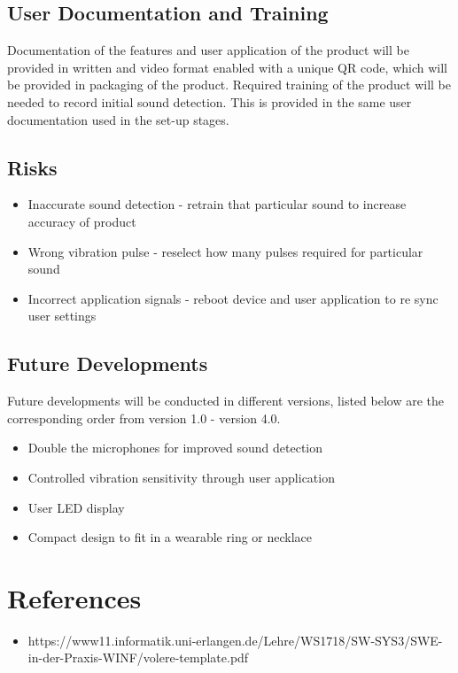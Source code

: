 \documentclass[12pt]{article}
\begin{document}
\raggedright

\subsection{User Documentation and Training}

Documentation of the features and user application of the product will be provided in written and video format enabled with a unique QR code, which will be provided in packaging of the product.
Required training of the product will be needed to record initial sound detection. This is provided in the same user documentation used in the set-up stages.

\subsection{Risks}

\begin{itemize}
  \item Inaccurate sound detection - retrain that particular sound to increase accuracy of product
  \item Wrong vibration pulse - reselect how many pulses required for particular sound
  \item Incorrect application signals - reboot device and user application to re sync user settings
\end{itemize}

\subsection{Future Developments}

Future developments will be conducted in different versions, listed below are the corresponding order from version 1.0 - version 4.0.

\begin{itemize}
  \item Double the microphones for improved sound detection
  \item Controlled vibration sensitivity through user application
  \item User LED display
  \item Compact design to fit in a wearable ring or necklace
\end{itemize}

\pagebreak

\section*{References}
\begin{itemize}
  \item https://www11.informatik.uni-erlangen.de/Lehre/WS1718/SW-SYS3/SWE-in-der-Praxis-WINF/volere-template.pdf
\end{itemize}
\end{document}
